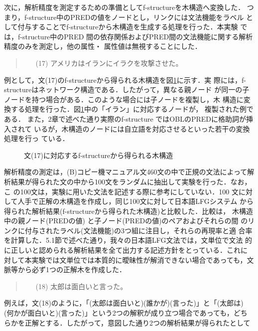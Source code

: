 次に，解析精度を測定するための準備としてf-structureを木構造へ変換した．
つまり，f-structure中のPREDの値をノードとし，リンクには文法機能をラベル
として付与することでf-structureから木構造を生成する処理を行った．本実験
では，f-structure中のPRED
間の依存関係およびPRED間の文法機能に関する解析精度のみを測定し，他の属性・
属性値は無視することにした．
\begin{quote}
\begin{itemize}
\item[(17)] アメリカはイランにイラクを攻撃させた。
\end{itemize}
\end{quote}
例として，文(17)のf-structureから得られる木構造を図\ref{fig5}に示す．実
際には，f-structureはネットワーク構造である．したがって，異なる親ノード
が同一の子ノードを持つ場合がある．このような場合には子ノードを複製し，木
構造に変換する処理を行った．図\ref{fig5}中の「イラン」に対応するノードが，
複製された例である．
また，2章で述べた通り実際のf-structure ではOBLのPREDに格助詞が挿入されて
いるが，木構造のノードには自立語を対応させるといった若干の変換処理を行っ
ている．
\begin{figure}[htbp]
\center
\epsfxsize=98.42mm
\caption{文(17)に対応するf-structureから得られる木構造}
\vspace{-3mm}
\label{fig5}
\end{figure}
解析精度の測定は，(B)コピー機マニュアル文460文の中で正規の文法によって解
析結果が得られた文の中から100文をランダムに抽出して実験を行った．なお，こ
の100文は，実験に用いた文法を記述する際に参考にしていない．100
文に対して人手で正解の木構造を作成し，同じ100文に対して日本語LFGシステム
から得られた解析結果(f-structureから得られた木構造)と比較した．比較は，
木構造中の親ノード(PREDの値) と子ノード(PREDの値)のペアおよびそれらの間
のリンクに付与されたラベル(文法機能)の3つ組に注目し，それらの再現率と適
合率を計算した．5.1節で述べた通り，我々の日本語LFG文法では，文単位で文法
的に正しいと認められる解析結果を全て出力する記述方針をとっている．これに
対して本実験では文単位では本質的に曖昧性が解消できない場合であっても，文
脈等から必ず1つの正解木を作成した．
\begin{quote}
\begin{itemize}
\item[(18)] 太郎は面白いと言った。
\end{itemize}
\end{quote}
例えば，文(18)のように，「(太郎は面白いと)(誰かが)(言った)」と「(太郎は)
(何かが面白いと)(言った)」という2つの解釈が成り立つ場合であっても，どち
らかを正解とする．したがって，意図した通り2つの解析結果が得られたとして
